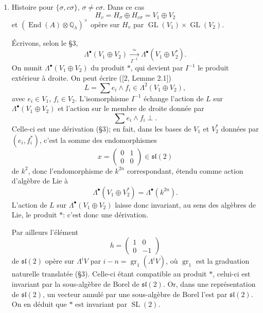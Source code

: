 \documentclass[11pt]{article}
\newcommand{\Q}{\mathbb Q}
\newcommand{\End}{\operatorname{End}}
\newcommand{\GL}{\operatorname{GL}}
\newcommand{\SL}{\operatorname{SL}}
\newcommand{\CSpin}{\operatorname{CSpin}}
\newcommand{\Lie}{\operatorname{Lie}}
\newcommand{\gr}{\operatorname{gr}}
\theoremstyle{deligne}
\begin{document}
\begin{enumerate}[label=(\alph*)]
On vérifie aussitôt que, pour son action sur $\Lambda^\bullet V$ par multiplication à gauche, $L$ vérifie
\[
[L,W]\subset W.
\]
Par conséquent, $L$ est un élément de $\Lie(\CSpin(W))$; celui-ci appartient à l'algèbre de Lie du radical unipotent $N$ du sous-groupe de Levi défini par $W=V\oplus V^*$ (\S3) et en est un élément non singulier. Les conjugués par $\GL(V)$ de l'exponentielle de $L$ engendrent donc $N$. De même, $\Lambda$ et ses conjugués engendrent l'algèbre de Lie du sous-groupe unipotent opposé. Par conséquent, le groupe engendré par $\GL(V)$ et $\SL(2)$ contient le groupe de Spin; on a déjà vu qu'il contenait les homothéties (\S2, (c)). Son adhérence de Zariski, sur $\Q_\ell$, est donc $\CSpin(V\oplus V^*)$, ce qui démontre le Théorème 2.

\item Histoire pour $\{\sigma,c\sigma\}$, $\sigma\ne c\sigma$. Dans ce cas
\[
H_v=H_\sigma\oplus H_{c\sigma}=V_1\oplus V_2
\]
et $(\End(A)\otimes\Q_\lambda)^\times$ opère sur $H_v$ par $\GL(V_1)\times\GL(V_2)$.

Écrivons, selon le \S3,
\[
\Lambda^\bullet(V_1\oplus V_2)\xrightarrow[\ I^{-1}\ ]{\simeq}
\Lambda^\bullet(V_1\oplus V_2^*).
\]
On munit $\Lambda^\bullet(V_1\oplus V_2)$ du produit $*$, qui devient par $I^{-1}$ le produit extérieur à droite. On peut écrire ([2, Lemme 2.1])
\[
L=\sum e_i\wedge f_i\in\Lambda^2(V_1\oplus V_2),
\]
avec $e_i\in V_1$, $f_i\in V_2$. L'isomorphisme $I^{-1}$ échange l'action de $L$ sur $\Lambda^\bullet(V_1\oplus V_2)$ et l'action sur le membre de droite donnée par
\[
\sum e_i\wedge f_i\perp.
\]
Celle-ci est une dérivation (\S3); en fait, dans les bases de $V_1$ et $V_2^*$ données par $(e_i,f_i^*)$, c'est la somme des endomorphismes
\[
x=\begin{pmatrix}0&1\\0&0\end{pmatrix}\in\mathfrak{sl}(2)
\]
de $k^2$, donc l'endomorphisme de $k^{2n}$ correspondant, étendu comme action d'algèbre de Lie à
\[
\Lambda^\bullet(V_1\oplus V_2^*)=\Lambda^\bullet(k^{2n}).
\]
L'action de $L$ sur $\Lambda^\bullet(V_1\oplus V_2)$ laisse donc invariant, au sens des algèbres de Lie, le produit $*$: c'est donc une dérivation.

Par ailleurs l'élément
\[
h=\begin{pmatrix}1&0\\0&-1\end{pmatrix}
\]
de $\mathfrak{sl}(2)$ opère sur $\Lambda^iV$ par $i-n=\gr_1(\Lambda^iV)$, où $\gr_1$ est la graduation naturelle translatée (\S3). Celle-ci étant compatible au produit $*$, celui-ci est invariant par la sous-algèbre de Borel de $\mathfrak{sl}(2)$. Or, dans une représentation de $\mathfrak{sl}(2)$, un vecteur annulé par une sous-algèbre de Borel l'est par $\mathfrak{sl}(2)$. On en déduit que $*$ est invariant par $\SL(2)$.


\end{enumerate}
\end{document}

